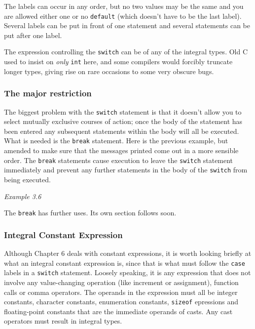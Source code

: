    The labels can occur in any order, but no two values may be the same and
    you are allowed either one or no \texttt{default} (which doesn't have
    to be the last label). Several labels can be put in front of one statement
    and several statements can be put after one label.


   The expression controlling the \texttt{switch} can be of any of the
    integral types. Old C used to insist on \textit{only}
    \texttt{int} here, and some compilers would forcibly truncate longer
    types, giving rise on rare occasions to some very obscure bugs.


   \subsubsection{The major restriction}
    

    The biggest problem with the \texttt{switch} statement is that it
     doesn't allow you to select mutually exclusive courses of action; once
     the body of the statement has been entered any subsequent statements
     within the body will all be executed. What is needed is the
     \texttt{break} statement. Here is the previous example, but amended
     to make sure that the messages printed come out in a more sensible order.
     The \texttt{break} statements cause execution to leave the
     \texttt{switch} statement immediately and prevent any further
     statements in the body of the \texttt{switch} from being
     executed.


    \begin{center}\textit{Example 3.6}\end{center}


    The \texttt{break} has further uses. Its own section follows
     soon.


   

   \subsubsection{Integral Constant Expression}
    

    Although Chapter 6 deals with constant expressions, it is
     worth looking briefly at what an integral constant expression is, since
     that is what must follow the \texttt{case} labels in a
     \texttt{switch} statement. Loosely speaking, it is any expression
     that does not involve any value-changing operation (like increment or
     assignment), function calls or comma operators. The operands in the
     expression must all be integer constants, character constants,
     enumeration constants, \texttt{sizeof} epressions and floating-point
     constants that are the immediate operands of casts. Any cast operators
     must result in integral types.



